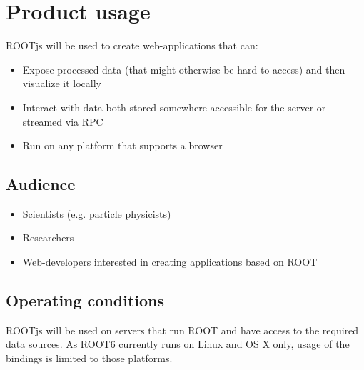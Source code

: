 \chapter{Product usage}

ROOTjs will be used to create web-applications that can:
\begin{itemize}
	\item Expose processed data (that might otherwise be hard to access) and then visualize it locally
	\item Interact with data both stored somewhere accessible for the server or streamed via RPC
	\item Run on any platform that supports a browser
\end{itemize}


\section{Audience}
\begin{itemize}
	\item Scientists (e.g. particle physicists)
	\item Researchers
	\item Web-developers interested in creating applications based on ROOT
\end{itemize}

\section{Operating conditions}

ROOTjs will be used on servers that run ROOT and have access to the required data sources. As ROOT6 currently runs on Linux and OS X only, usage of the bindings is limited to those platforms.
